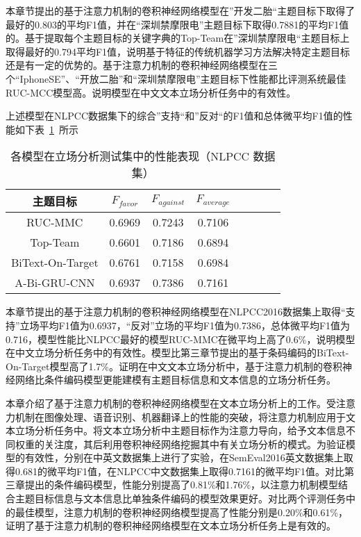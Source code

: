 本章节提出的基于注意力机制的卷积神经网络模型在”开发二胎“主题目标下取得了最好的0.803的平均F1值，并在“深圳禁摩限电”主题目标下取得0.7881的平均F1值的。基于提取每个主题目标的关键字典的Top-Team在”深圳禁摩限电“主题目标上取得最好的0.794平均F1值，说明基于特征的传统机器学习方法解决特定主题目标还是有一定的优势的。基于注意力机制的卷积神经网络模型在三个“IphoneSE”、“开放二胎”和“深圳禁摩限电”主题目标下性能都比评测系统最佳RUC-MCC模型高。说明模型在中文文本立场分析任务中的有效性。

上述模型在NLPCC数据集下的综合”支持“和”反对“的F1值和总体微平均F1值的性能如下表~\ref{nlpcc_res_attention}~所示
\begin{table}[htbp]
	\caption[table123]{各模型在立场分析测试集中的性能表现（NLPCC 数据集）}
	\label{nlpcc_res_attention}
	\vspace{0.5em}\centering\wuhao
	\begin{tabular}{cccccccc}
		\toprule[1.5pt]
		主题目标& $F_{favor}$&$F_{against}$&$F_{average}$ \\
		\midrule[1pt]
		RUC-MMC&0.6969&0.7243&0.7106\\
		Top-Team&0.6601&0.7186&0.6894\\
		BiText-On-Target&0.6761&0.7158&0.6984\\
		A-Bi-GRU-CNN&0.6937&0.7386&0.7161\\
		\bottomrule[1.5pt]
	\end{tabular}
\end{table}

本章节提出的基于注意力机制的卷积神经网络模型在NLPCC2016数据集上取得“支持”立场平均F1值为0.6937，“反对”立场的平均F1值为0.7386，总体微平均F1值为0.716，模型性能比NLPCC最好的模型RUC-MMC在微平均上高了0.6\%，说明模型在中文立场分析任务中的有效性。模型比第三章节提出的基于条码编码的BiText-On-Target模型高了1.7\%。证明在中文文本立场分析中，基于注意力机制的卷积神经网络比条件编码模型更能建模有主题目标信息和文本信息的立场分析任务。



本章介绍了基于注意力机制的卷积神经网络模型在文本立场分析上的工作。受注意力机制在图像处理、语音识别、机器翻译上的性能的突破，将注意力机制应用于文本立场分析任务中。将文本立场分析中主题目标作为注意力导向，给予文本信息不同权重的关注度，其后利用卷积神经网络挖掘其中有关立场分析的模式。为验证模型的有效性，分别在中英文数据集上进行了实验，在SemEval2016英文数据集上取得0.681的微平均F1值，在NLPCC中文数据集上取得0.7161的微平均F1值。对比第三章提出的条件编码模型，性能分别提高了0.81\%和1.76\%，以注意力机制模型结合主题目标信息与文本信息比单独条件编码的模型效果更好。对比两个评测任务中的最佳模型，注意力机制的卷积神经网络模型提高了性能分别是0.20\%和0.61\%，证明了基于注意力机制的卷积神经网络模型在文本立场分析任务上是有效的。



